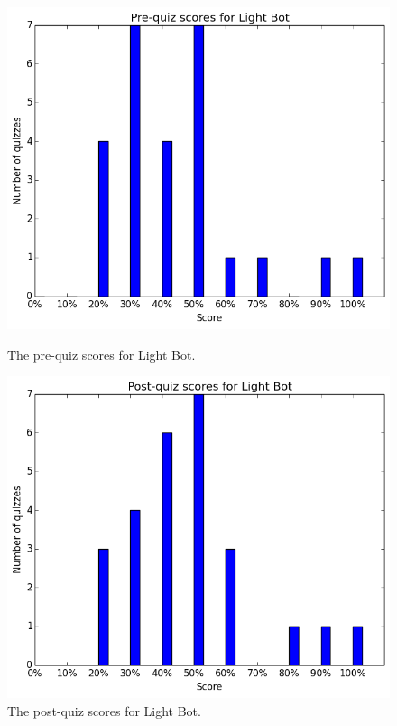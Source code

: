 			\begin{figure}[h] 
			\centering 
			\begin{minipage}[b]{0.45\linewidth}
			\includegraphics[height=0.33\textheight]{lightbot_pre.png} 
			\caption{The pre-quiz scores for Light Bot.}
			\end{minipage}
			\quad
			\begin{minipage}[b]{0.45\linewidth}
			\includegraphics[height=0.33\textheight]{lightbot_post.png} 
			\caption{The post-quiz scores for Light Bot.}
			\end{minipage}
			\end{figure}

